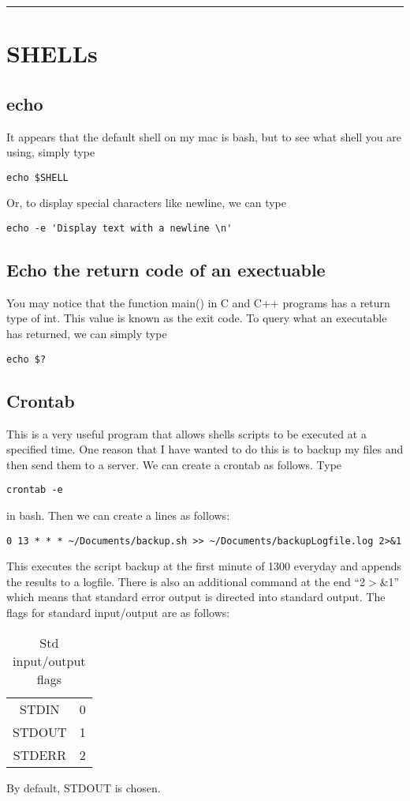 \documentclass[a4paper, 10pt]{article}
\newcommand{\mybotrule}{\vspace{4mm}\hrule}
\begin{document}
\mybotrule


\vspace{10mm}
\section*{SHELLs}

\subsection*{echo}
It appears that the default shell on my mac is bash, but to see what shell you are using, simply type
\begin{verbatim}
echo $SHELL
\end{verbatim}
Or, to display special characters like newline, we can type
\begin{verbatim}
echo -e 'Display text with a newline \n'
\end{verbatim}

\subsection{Echo the return code of an exectuable}
You may notice that the function main() in C and C++ programs has a return type of int. This value is known as the exit code. To query what an executable has returned, we can simply type
\begin{verbatim}
echo $?
\end{verbatim}

\subsection*{Crontab}

This is a very useful program that allows shells scripts to be executed at a specified time. One reason that I have wanted to do this is to backup my files and then send them to a server. We can create a crontab as follows. Type
\begin{Verbatim}
crontab -e
\end{Verbatim}
in bash. Then we can create a lines as follows:
\begin{Verbatim}
0 13 * * * ~/Documents/backup.sh >> ~/Documents/backupLogfile.log 2>&1
\end{Verbatim}
This executes the script backup at the first minute of 1300 everyday and appends the results to a logfile. There is also an additional command at the end ``2$>$\&1'' which means that standard error output is directed into standard output. The flags for standard input/output are as follows:
\begin{table}[htdp]
\caption{Std input/output flags}
\begin{center}
\begin{tabular}{|c|c|}
\hline
STDIN & 0\\
STDOUT & 1\\
STDERR & 2\\
\hline
\end{tabular}
\end{center}
\label{default}
\end{table}%
By default, STDOUT is chosen.
\end{document}
